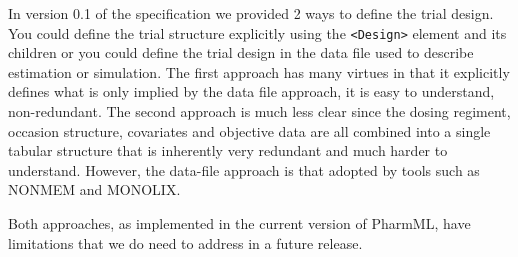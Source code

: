 \documentclass[a4paper,11pt]{article}
\newcommand{\pharmml}{PharmML\xspace}
\newcommand{\xelem}[1]{\texttt{<#1>}\index{XML Element!\texttt{<#1>}}}
\begin{document}
In version 0.1 of the specification we provided 2 ways to define the
trial design. You could define the trial structure explicitly using
the \xelem{Design} element and its children or you could define the
trial design in the data file used to describe estimation or
simulation. The first approach has many virtues in that it explicitly
defines what is only implied by the data file approach, it is easy
to understand, non-redundant. The second approach is much less clear
since the dosing regiment, occasion structure, covariates and
objective data are all combined into a single tabular structure that
is inherently very redundant and much harder to understand. However,
the data-file approach is that adopted by tools such as NONMEM and
MONOLIX.

Both approaches, as implemented in the current version of \pharmml,
have limitations that we do need to address in a future release.
\end{document}
